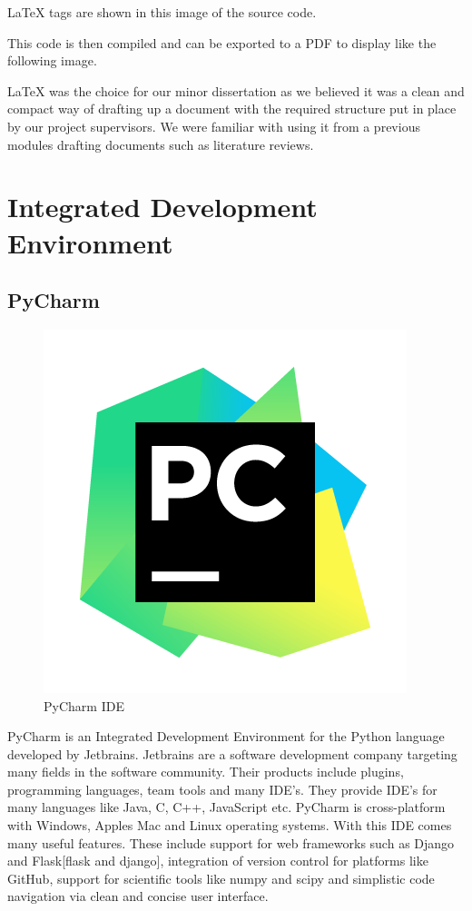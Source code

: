 LaTeX tags are shown in this image of the source code.


This code is then compiled and can be exported to a PDF to display like the following image.


LaTeX was the choice for our minor dissertation as we believed it was a clean and compact way of drafting up a document with the required structure put in place by our project supervisors. We were familiar with using it from a previous modules drafting documents such as literature reviews.

\newpage
\section{Integrated Development Environment}

\subsection{PyCharm}

\begin{figure}
\includegraphics[scale=0.25]{img/PyCharm.png}
\caption{PyCharm IDE}
\end{figure}
PyCharm is an Integrated Development Environment for the Python language developed by Jetbrains. Jetbrains are a software development company targeting many fields in the software community. Their products include plugins, programming languages, team tools and many IDE's. They provide IDE's for many languages like Java, C, C++, JavaScript etc. PyCharm is cross-platform with Windows, Apples Mac and Linux operating systems. With this IDE comes many useful features. These include support for web frameworks such as Django and Flask[flask and django], integration of version control for platforms like GitHub, support for scientific tools like numpy and scipy and simplistic code navigation via clean and concise user interface.

